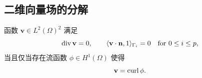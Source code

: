 \subsection{二维向量场的分解}\label{subsec:two-dimensional-decomposition}
\setcounter{statement}{0}
\setcounter{equation}{0}
\begin{Theorem}\label{thm:sec3-stream-function-characterization}
函数 $\mathbf v\in L^2(\Omega)^2$ 满足
\begin{equation}\label{eq:sec3-divfree-zero-flux}
  \operatorname{div}\mathbf v=0,
  \qquad\langle\mathbf v\cdot\mathbf n,1\rangle_{\Gamma_i}=0
  \quad\text{for }0\le i\le p,
\end{equation}
当且仅当存在流函数 $\phi\in H^1(\Omega)$ 使得
\begin{equation}\label{eq:sec3-v-curl-phi}
  \mathbf v=\operatorname{curl}\phi.
\end{equation}
\end{Theorem}
